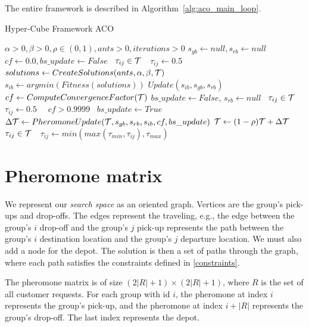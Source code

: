 The entire framework is described in Algorithm~\ref{alg:aco_main_loop}. 

\begin{algorithm}
\caption{Hyper-Cube Framework ACO \cite{HCFMMAS}}
\begin{algorithmic}
\Require $\alpha > 0, \beta > 0, \rho \in (0, 1), ants > 0, iterations > 0$
\State $s_{gb} \gets null, s_{rb} \gets null$  
\State $cf \gets 0.0, bs\_update \gets False$
\State \algorithmicforall\ $\tau_{ij} \in \mathcal{T}$\ \algorithmicdo\ $\tau_{ij} \gets 0.5$\
    \State $solutions \gets CreateSolutions(ants, \alpha, \beta, \mathcal{T})$
    \State $s_{ib} \gets argmin(Fitness(solutions))$
    \State $Update(s_{ib}, s_{gb}, s_{rb})$
    \State $cf \gets ComputeConvergenceFactor(\mathcal{T})$
        \State $bs\_update \gets False$, $s_{rb} \gets null$
        \State \algorithmicforall\ $\tau_{ij} \in \mathcal{T}$\ \algorithmicdo\ $\tau_{ij} \gets 0.5$\
    \Else
        \State \algorithmicif\ $cf > 0.9999$ \algorithmicdo\ $bs\_update \gets True$
        \State $\Delta\mathcal{T} \gets PheromoneUpdate(\mathcal{T}, s_{gb}, s_{rb}, s_{ib}, cf, bs\_update)$
        \State $\mathcal{T} \gets (1-\rho)\mathcal{T} + \Delta\mathcal{T}$  
        \State \algorithmicforall\ $\tau_{ij} \in \mathcal{T}$\ \algorithmicdo\ $\tau_{ij} \gets min(max(\tau_{min}, \tau_{ij}), \tau_{max})$
    \EndIf
\EndFor
\end{algorithmic}
\label{alg:aco_main_loop}
\end{algorithm}

\section{Pheromone matrix}

We represent our \textit{search space} as an oriented graph. Vertices are the group's pick-ups and drop-offs. The edges represent the traveling, e.g., the edge between the group’s $i$ drop-off and the group’s $j$ pick-up represents the path between the group’s $i$ destination location and the group’s $j$ departure location. We must also add a node for the depot. The solution is then a set of paths through the graph, where each path satisfies the constraints defined in \ref{constraints}.

The pheromone matrix is of size $(2|R| + 1) \times (2|R| + 1)$, where $R$ is the set of all customer requests. For each group with id $i$, the pheromone at index $i$ represents the group's pick-up, and the pheromone at index $i + |R|$ represents the group's drop-off. The last index represents the depot.

